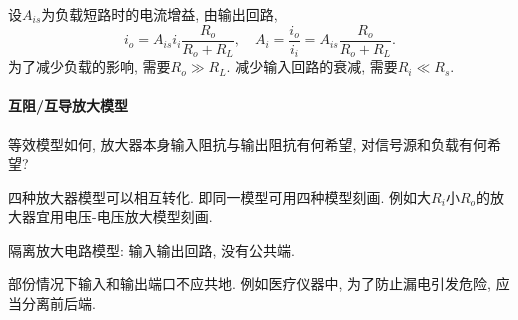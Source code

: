 \documentclass[hidelinks]{ctexart}
\begin{document}
设$A_{is}$为负载短路时的电流增益, 由输出回路,
\[ i_o = A_{is}i_i \frac{R_o}{R_o + R_L},\quad A_i = \frac{i_o}{i_i} = A_{is}\frac{R_o}{R_o+R_L}. \]
为了减少负载的影响, 需要$R_o \gg R_L$. 减少输入回路的衰减, 需要$R_i \ll R_s$.


\paragraph{互阻/互导放大模型} %
\label{par:互阻_互导放大模型}

等效模型如何, 放大器本身输入阻抗与输出阻抗有何希望, 对信号源和负载有何希望?
\par
四种放大器模型可以相互转化. 即同一模型可用四种模型刻画. 例如大$R_i$小$R_o$的放大器宜用电压-电压放大模型刻画.
\par
隔离放大电路模型: 输入输出回路, 没有公共端.
\begin{ex}
    部份情况下输入和输出端口不应共地. 例如医疗仪器中, 为了防止漏电引发危险, 应当分离前后端.
\end{ex}



\end{document}
